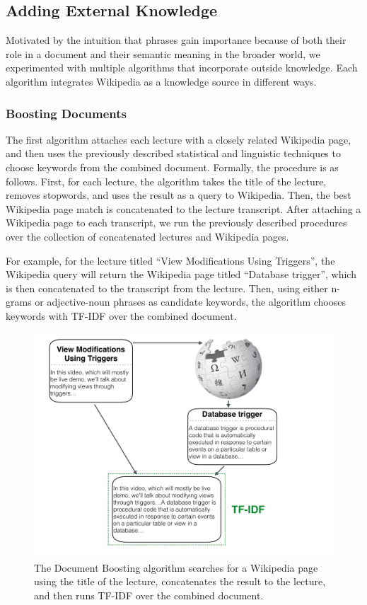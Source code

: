 \subsection{Adding External Knowledge}
\label{sec:wiki}


Motivated by the intuition that phrases gain importance because of both their role in a document and their semantic meaning in the broader world, we experimented with multiple algorithms that incorporate outside knowledge. Each algorithm integrates Wikipedia as a knowledge source in different ways.

\subsubsection{Boosting Documents}

The first algorithm attaches each lecture with a closely related Wikipedia page, and then uses the previously described statistical and linguistic techniques to choose keywords from the combined document. Formally, the procedure is as follows. First, for each lecture, the algorithm takes the title of the lecture, removes stopwords, and uses the result as a query to Wikipedia. Then, the best Wikipedia page match is concatenated to the lecture transcript. After attaching a Wikipedia page to each transcript, we run the previously described procedures over the collection of concatenated lectures and Wikipedia pages.

For example, for the lecture titled ``View Modifications Using Triggers'', the Wikipedia query will return the Wikipedia page titled ``Database trigger'', which is then concatenated to the transcript from the lecture. Then, using either n-grams or adjective-noun phrases as candidate keywords, the algorithm chooses keywords with TF-IDF over the combined document.

\begin{figure}[h!]
\caption{The Document Boosting algorithm searches for a Wikipedia page using the title of the lecture, concatenates the result to the lecture, and then runs TF-IDF over the combined document.}
\includegraphics[width=\textwidth]{document_boosting.pdf}
\end{figure}


